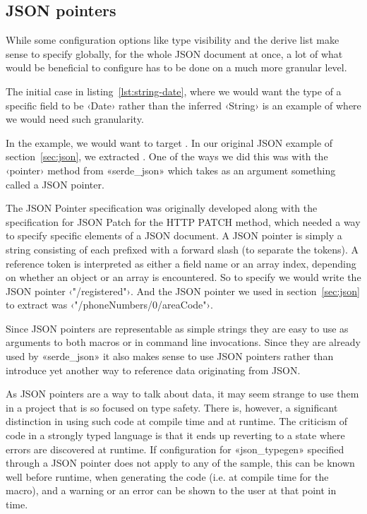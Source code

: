 \subsection{JSON pointers}
\label{sec:json-pointers}

While some configuration options like type visibility and the derive list make sense to specify globally, for the whole JSON document at once, a lot of what would be beneficial to configure has to be done on a much more granular level.

The initial case in listing~\ref{lst:string-date}, where we would want the type of a specific field to be ‹Date› rather than the inferred ‹String› is an example of where we would need such granularity.

In the example, we would want to target . In our original JSON example of section~\ref{sec:json}, we extracted . One of the ways we did this was with the ‹pointer› method from «serde_json» which takes as an argument something called a JSON pointer.

The JSON Pointer specification\cite{RFC6901} was originally developed along with the specification for JSON Patch\cite{RFC6902} for the HTTP PATCH method, which needed a way to specify specific elements of a JSON document. A JSON pointer is simply a string consisting of  each prefixed with a forward slash (to separate the tokens). A reference token is interpreted as either a field name or an array index, depending on whether an object or an array is encountered. So to specify  we would write the JSON pointer ‹"/registered"›. And the JSON pointer we used in section~\ref{sec:json} to extract  was ‹"/phoneNumbers/0/areaCode"›.

Since JSON pointers are representable as simple strings they are easy to use as arguments to both macros or in command line invocations. Since they are already used by «serde_json» it also makes sense to use JSON pointers rather than introduce yet another way to reference data originating from JSON.

As JSON pointers are a  way to talk about data, it may seem strange to use them in a project that is so focused on type safety. There is, however, a significant distinction in using such code at compile time and at runtime. The criticism of  code in a strongly typed language is that it ends up reverting to a state where errors are discovered at runtime. If configuration for «json_typegen» specified through a JSON pointer does not apply to any of the sample, this can be known well before runtime, when generating the code (i.e. at compile time for the macro), and a warning or an error can be shown to the user at that point in time.

